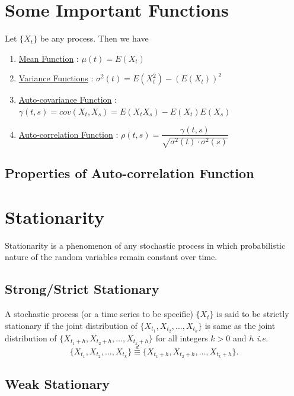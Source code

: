 \documentclass[11pt, a4paper]{article}
\numberwithin{equation}{section}
\theoremstyle{definition}
\begin{document}
\newpage
\section{Some Important Functions}

Let $\{X_t\}$ be any process. Then we have

\begin{enumerate}[(1)]

\item \underline{Mean Function} : $\mu(t) = E(X_t)$

\item \underline{Variance Functions} : $\sigma^2(t) = E(X_t^2) - (E(X_t))^2$

\item \underline{Auto-covariance Function} : $\gamma(t, s) = cov(X_t, X_s) = E(X_t X_s) - E(X_t)E(X_s)$

\item \underline{Auto-correlation Function} : $\rho(t, s) = \dfrac{\gamma(t, s)}{\sqrt{\sigma^2(t) \cdot \sigma^2(s)}}$
\end{enumerate}

\subsection{Properties of Auto-correlation Function}

\newpage
\section{Stationarity}

Stationarity is a phenomenon of any stochastic process in which probabilistic nature of the random variables remain constant over time.

\subsection{Strong/Strict Stationary}

A stochastic process (or a time series to be specific) $\{X_t\}$ is said to be strictly stationary if the joint distribution of $\{X_{t_1}, X_{t_2}, \ldots, X_{t_k}\}$ is same as the joint distribution of $\{X_{t_1 + h}, X_{t_2 + h}, \ldots, X_{t_k + h}\}$ for all integers $k > 0$ and $h$ \textit{i.e.} $$\{X_{t_1}, X_{t_2}, \ldots, X_{t_k}\} \overset{d}{\equiv} \{X_{t_1 + h}, X_{t_2 + h}, \ldots, X_{t_k + h}\}.$$

\subsection{Weak Stationary}
\end{document}
